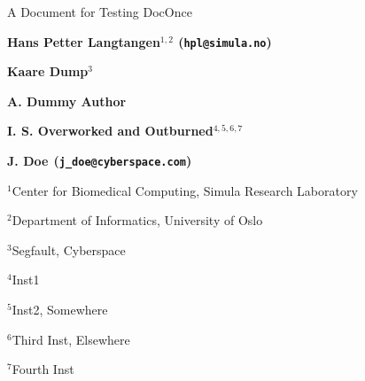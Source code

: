 \documentclass[%
oneside,                 %
final,                   %
10pt]{article}
\theoremstyle{definition}
\begin{document}

\newcommand{\exercisesection}[1]{\subsection*{#1}}








\thispagestyle{empty}

\begin{center}
{\LARGE\bf
\begin{spacing}{1.25}
A Document for Testing DocOnce
\end{spacing}
}
\end{center}


\begin{center}
{\bf Hans Petter Langtangen${}^{1, 2}$ (\texttt{hpl@simula.no})} \\ [0mm]
\end{center}


\begin{center}
{\bf Kaare Dump${}^{3}$} \\ [0mm]
\end{center}


\begin{center}
{\bf A. Dummy Author${}^{}$} \\ [0mm]
\end{center}


\begin{center}
{\bf I. S. Overworked and Outburned${}^{4, 5, 6, 7}$} \\ [0mm]
\end{center}


\begin{center}
{\bf J. Doe${}^{}$ (\texttt{j\_doe@cyberspace.com})} \\ [0mm]
\end{center}

\begin{center}
\centerline{{\small ${}^1$Center for Biomedical Computing, Simula Research Laboratory}}
\centerline{{\small ${}^2$Department of Informatics, University of Oslo}}
\centerline{{\small ${}^3$Segfault, Cyberspace}}
\centerline{{\small ${}^4$Inst1}}
\centerline{{\small ${}^5$Inst2, Somewhere}}
\centerline{{\small ${}^6$Third Inst, Elsewhere}}
\centerline{{\small ${}^7$Fourth Inst}}
\end{center}
    
\end{document}

